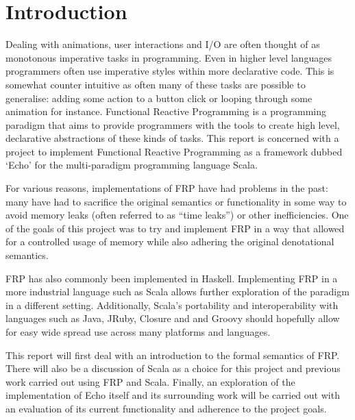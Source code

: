 \chapter{Introduction}

  Dealing with animations, user interactions and I/O are often thought of as monotonous imperative tasks
  in programming. Even in higher level languages programmers often use imperative
  styles within more declarative code. This is somewhat counter intuitive as often many of these tasks are possible to generalise: adding
  some action to a button click or looping through some animation for instance. Functional Reactive Programming
  is a programming paradigm that aims to provide programmers with the tools to create high level,
  declarative abstractions of these kinds of tasks. This report is concerned with a project to
  implement Functional Reactive Programming as a framework dubbed `Echo' \cite{Stott} for the multi-paradigm programming language
  Scala.

  For various reasons, implementations of FRP have had problems in the past: many have had to sacrifice the original semantics or functionality in some way to avoid
  memory leaks (often referred to as ``time leaks'') or other inefficiencies. One of the goals
  of this project was to try and implement FRP in a way that allowed for a controlled usage of memory while also
  adhering the original denotational semantics. 
  
  FRP
  has also commonly been implemented in Haskell. Implementing FRP in a more industrial language such as Scala allows
  further exploration of the paradigm in a different setting. Additionally, Scala's portability and interoperability with
  languages such as Java, JRuby, Closure and and Groovy should hopefully allow for easy wide spread use across many platforms and languages. 

  This report will first deal with an introduction to the formal semantics of FRP. There will also be a discussion of Scala as a 
  choice for this project and previous work carried out using FRP and Scala.
  Finally, an exploration of the implementation of Echo itself and its surrounding work will be carried out with an
  evaluation of its current functionality and adherence to the project goals.